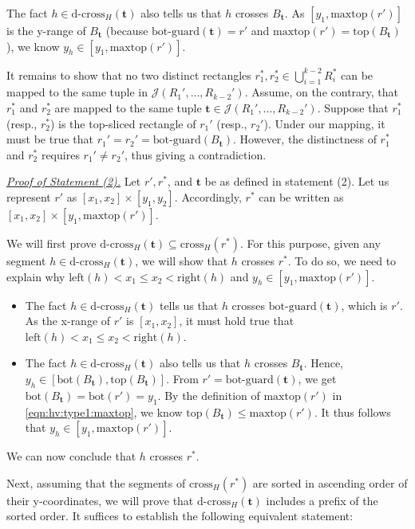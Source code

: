 \documentclass[sigconf]{acmart}
\def\vgap{\vspace{0mm}}
\def\extraspacing{\vspace{1.5mm} \noindent}
\def\J{\mathcal{J}}
\def\xleft{\mathrm{left}}
\def\xright{\mathrm{right}}
\def\ybot{\mathrm{bot}}
\def\ytop{\mathrm{top}}
\def\maxtop{\mathrm{maxtop}}
\def\gbot{\mathrm{bot\text{-}guard}}
\def\cross{\mathrm{cross}}
\def\dcross{\mathrm{d\text{-}cross}}
\begin{document}
{{{{    \vgap

    \item The fact $h \in \dcross_H(\bm{t})$ also tells us that $h$ crosses $B_{\bm{t}}$. As $[y_1, \maxtop(r')]$ is the y-range of $B_\bm{t}$ (because $\gbot(\bm{t}) = r'$ and $\maxtop(r') = \ytop(B_\bm{t})$), we know $y_h \in [y_1, \maxtop(r')]$.
}

It remains to show that no two distinct rectangles $r_1^*, r_2^* \in \bigcup_{i = 1}^{k-2}R_i^*$ can be mapped to the same tuple in $\J(R_1',...,R_{k-2}')$. Assume, on the contrary, that $r_1^*$ and $r_2^*$ are mapped to the same tuple $\bm{t}\in \J(R_1',...,R_{k-2}')$. Suppose that $r_1^*$ (resp., $r_2^*$) is the top-sliced rectangle of $r_1'$ (resp., $r_2'$). Under our mapping, it must be true that  $r_1' = r_2' = \gbot(B_{\bm{t}})$. However, the distinctness of $r_1^*$ and $r_2^*$ requires $r_1' \ne r_2'$, thus giving a contradiction.

\extraspacing \underline{\em Proof of Statement (2).}
Let $r', r^*$, and $\bm{t}$ be as defined in statement (2). Let us represent $r'$ as $[x_1,x_2] \times [y_1, y_2]$. Accordingly, $r^*$ can be written as $[x_1, x_2] \times [y_1, \maxtop(r')]$.

\vgap

We will first prove $\dcross_H(\bm{t})\subseteq \cross_H(r^*)$. For this purpose, given any segment $h \in \dcross_H(\bm{t})$, we will show that $h$ crosses $r^*$. To do so, we need to explain why $\xleft(h) < x_1 \le x_2 < \xright(h)$ and $y_h \in [y_1, \maxtop(r')]$.
\begin{itemize}
    \item The fact $h \in \dcross_H(\bm{t})$ tells us that $h$ crosses $\gbot(\bm{t})$, which is $r'$. As the x-range of $r'$ is $[x_1,x_2]$, it must hold true that $\xleft(h) < x_1 \le x_2 < \xright(h)$.

    \vgap

    \item The fact $h \in \dcross_H(\bm{t})$ also tells us that $h$ crosses $B_{\bm{t}}$. Hence, $y_h \in [\ybot(B_\bm{t}), \ytop(B_{\bm{t}})]$. From $r' = \gbot(\bm{t})$, we get $\ybot(B_\bm{t}) = \ybot(r') = y_1$. By the definition of $\maxtop(r')$ in \eqref{eqn:hv:type1:maxtop}, we know $\ytop(B_{\bm{t}}) \leq \maxtop(r')$. It thus follows that $y_h \in [y_1, \maxtop(r')]$.
\end{itemize}
We can now conclude that $h$ crosses $r^*$.

\vgap

Next, assuming that the segments of $\cross_H(r^*)$ are sorted in ascending order of their y-coordinates,
we will prove that $\dcross_H(\bm{t})$ includes a prefix of the sorted order. It suffices to establish the following equivalent statement:

}}}
\end{document}
